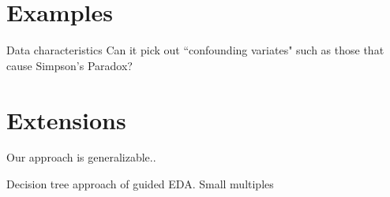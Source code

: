\section{Examples}

Data characteristics
Can it pick out ``confounding variates" such as those that cause Simpson's Paradox?

\section{Extensions}
Our approach is generalizable..

Decision tree approach of guided EDA.
Small multiples



